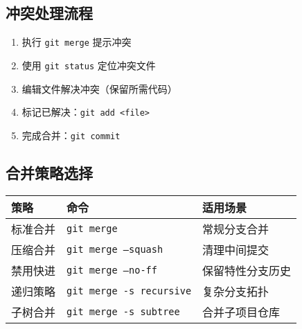 \subsection{冲突处理流程}
\begin{enumerate}[leftmargin=*, nosep]
    \item 执行 \texttt{git merge} 提示冲突
    \item 使用 \texttt{git status} 定位冲突文件
    \item 编辑文件解决冲突（保留所需代码）
    \item 标记已解决：\texttt{git add <file>}
    \item 完成合并：\texttt{git commit}
\end{enumerate}

\subsection{合并策略选择}
\begin{center}
\begin{tabular}{@{}llp{8cm}@{}}
    \toprule
    \textbf{策略} & \textbf{命令} & \textbf{适用场景} \\
    \midrule
    标准合并 & \texttt{git merge} & 常规分支合并 \\
    压缩合并 & \texttt{git merge --squash} & 清理中间提交 \\
    禁用快进 & \texttt{git merge --no-ff} & 保留特性分支历史 \\
    递归策略 & \texttt{git merge -s recursive} & 复杂分支拓扑 \\
    子树合并 & \texttt{git merge -s subtree} & 合并子项目仓库 \\
    \bottomrule
\end{tabular}
\end{center}

